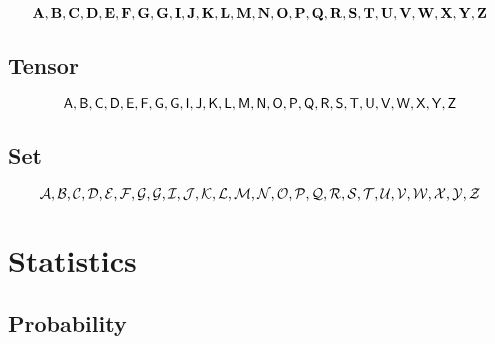 \documentclass[a4paper,11pt]{article}
\begin{document}
\begin{equation*}
\mathbf{A}, \mathbf{B}, \mathbf{C}, \mathbf{D}, \mathbf{E}, \mathbf{F}, \mathbf{G}, \mathbf{G}, \mathbf{I}, \mathbf{J}, \mathbf{K}, \mathbf{L}, \mathbf{M}, \mathbf{N}, \mathbf{O}, \mathbf{P}, \mathbf{Q}, \mathbf{R}, \mathbf{S}, \mathbf{T}, \mathbf{U}, \mathbf{V}, \mathbf{W}, \mathbf{X}, \mathbf{Y}, \mathbf{Z}
\end{equation*}


\subsection{Tensor}
\label{sub:tensor}

\begin{equation*}
\mathsf{A}, \mathsf{B}, \mathsf{C}, \mathsf{D}, \mathsf{E}, \mathsf{F}, \mathsf{G}, \mathsf{G}, \mathsf{I}, \mathsf{J}, \mathsf{K}, \mathsf{L}, \mathsf{M}, \mathsf{N}, \mathsf{O}, \mathsf{P}, \mathsf{Q}, \mathsf{R}, \mathsf{S}, \mathsf{T}, \mathsf{U}, \mathsf{V}, \mathsf{W}, \mathsf{X}, \mathsf{Y}, \mathsf{Z}
\end{equation*}

\subsection{Set}
\label{sub:set}

\begin{equation*}
\mathcal{A}, \mathcal{B}, \mathcal{C}, \mathcal{D}, \mathcal{E}, \mathcal{F}, \mathcal{G}, \mathcal{G}, \mathcal{I}, \mathcal{J}, \mathcal{K}, \mathcal{L}, \mathcal{M}, \mathcal{N}, \mathcal{O}, \mathcal{P}, \mathcal{Q}, \mathcal{R}, \mathcal{S}, \mathcal{T}, \mathcal{U}, \mathcal{V}, \mathcal{W}, \mathcal{X}, \mathcal{Y}, \mathcal{Z}
\end{equation*}

\section{Statistics}
\label{sec:statistics}

\subsection{Probability} %
\label{sub:probability}
\end{document}
